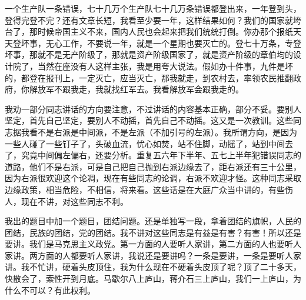 一个生产队一条错误，七十几万个生产队七十几万条错误都登出来，一年登到头，登得完登不完？还有文章长短，我看至少要一年，这样结果如何？我们的国家就垮台了，那时候帝国主义不来，国内人民也会起来把我们统统打倒。你办那个报纸天天登坏事，无心工作，不要说一年，就是一个星期也要灭亡的。登七十万条，专登坏事，那就不是无产阶级了，那就是资产阶级国家了，就是资产阶级的章伯均的设计院了，当然在座没有人这样主张，我是用夸大说法。假如办十件事，九件是坏的，都登在报刊上，一定灭亡，应当灭亡，那我就走，到农村去，率领农民推翻政府，你解放军不跟我走，我就找红军去。我看解放军会跟我走的。

我劝一部分同志讲话的方向要注意，不过讲话的内容基本正确，部分不妥。要别人坚定，首先自己坚定，要别人不动摇，首先自己不动摇。这又是一次教训。这些同志据我看不是右派是中间派，不是左派（不加引号的左派）。我所谓方向，是因为一些人碰了一些钉子了，头破血流，忧心如焚，站不住脚，动摇了，站到中间去了，究竟中间偏左偏右，还要分析。重复五六年下半年、五七上半年犯错误同志的道路，他们不是右派，可是自己把自己抛到右派边缘去了，距右派还有三十公里，因为右派很欢迎这个论凋，现在有些同志的论调，右派不欢迎才怪。这种同志采取边缘政策，相当危险，不相信，将来看。这些话是在大庭广众当中讲的，有些伤人，现在不讲，对这些同志不利。

我出的题目中加一个题目，团结问题。还是单独写一段，拿着团结的旗帜，人民的团结，民族的团结，党的团结。我不讲对这些同志是有益是有害？有害！所以还是要讲。我们是马克思主义政党。第一方面的人要听人家讲，第二方面的人也要听人家讲。两方面的人都要听人家讲，我说还是要讲吗？一条是要讲，一条是要听人家讲。我不忙讲，硬着头皮顶住，我为什么现在不硬着头皮顶了呢？顶了二十多天，快散会了，索性开到月底。马歇尔八上庐山，蒋介石三上庐山，我们一上庐山，为什么不可以？有此权利。

